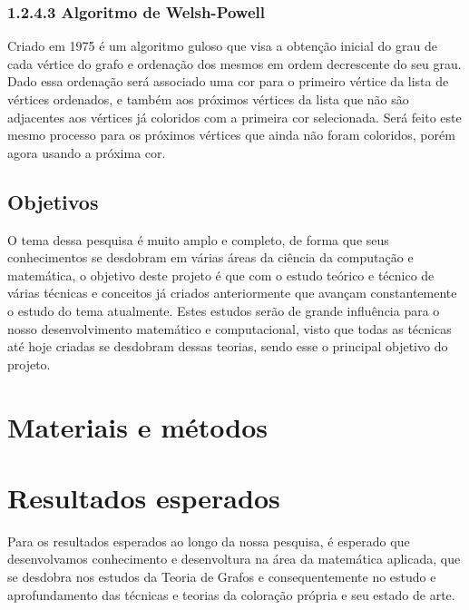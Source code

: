 \documentclass[12pt]{article}
\begin{document}
	
	\subsubsection*{1.2.4.3 Algoritmo de Welsh-Powell}
	
	Criado em 1975 é um algoritmo guloso que visa a obtenção inicial do grau de cada vértice do grafo e ordenação dos mesmos em ordem decrescente do seu grau. Dado essa ordenação será associado uma cor para o primeiro vértice da lista de vértices ordenados, e também aos próximos vértices da lista que não são adjacentes aos vértices já coloridos com a primeira cor selecionada. Será feito este mesmo processo para os próximos vértices que ainda não foram coloridos, porém agora usando a próxima cor.
	
	\subsection{Objetivos}
	
	O tema dessa pesquisa é muito amplo e completo, de forma que seus conhecimentos se desdobram em várias áreas da ciência da computação e matemática, o objetivo deste projeto é que com o estudo teórico e técnico de várias técnicas e conceitos já criados anteriormente que avançam constantemente o estudo do tema atualmente.
	Estes estudos serão de grande influência para o nosso desenvolvimento matemático e computacional, visto que todas as técnicas até hoje criadas se desdobram dessas teorias, sendo esse o principal objetivo do projeto.
	
	
	\section{Materiais e métodos}
	
	
	
	\section{Resultados esperados}
	Para os resultados esperados ao longo da nossa pesquisa, é esperado que desenvolvamos conhecimento e desenvoltura na área da matemática aplicada, que se desdobra nos estudos da Teoria de Grafos e consequentemente no estudo e aprofundamento das técnicas e teorias da coloração própria e seu estado de arte.
	
	
	
\end{document}

